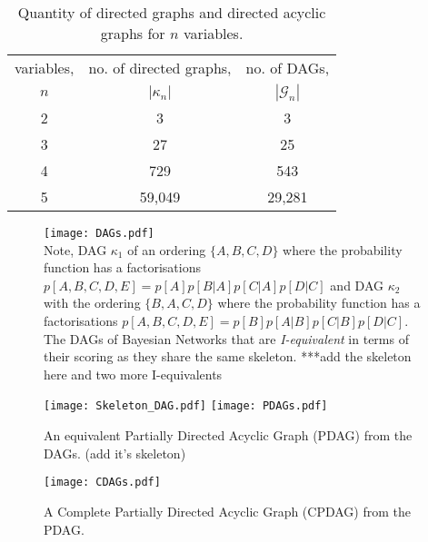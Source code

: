 \documentclass[7pt]{article}
\begin{document}
\begin{table}
\begin{center}
\begin{tabular}{ccc}
	\toprule
	variables, & no. of directed graphs,  & no. of DAGs,  \\
	$n$  & $|\mathcal{\kappa}_n|$ &  $|\mathcal{G}_n|$  \\
	\toprule
	2 & 3 & 3    					\\
	3 & 27 & 25   				  \\
    4 & 729 & 543  				\\
    5 & 59,049 & 29,281 	 \\
    \toprule

\end{tabular}
\caption{Quantity of directed graphs and directed acyclic graphs for $n$ variables.}
 \label{DAGS1}
\end{center}
\end{table}
\begin{figure}
	\centering
	\texttt{[image: DAGs.pdf]} \\
		\caption{Note, DAG $\mathcal{\kappa}_1$ of an ordering $\{A, B, C, D\}$ where the probability function has a factorisations $p[A,B,C,D,E] = p[A]p[B|A]p[C|A]p[D|C]$ and DAG $\mathcal{\kappa}_2$  with the ordering $\{B,A,C,D \}$ where the probability function has a  factorisations $p[A,B,C,D,E] = p[B]p[A|B]p[C|B]p[D|C]$. The DAGs of Bayesian Networks that are \emph{I-equivalent} in terms of their scoring as they share the same skeleton. ***add the skeleton here and two more I-equivalents }
		\label{DAGs}
				\texttt{[image: Skeleton\_DAG.pdf]} 
	\texttt{[image: PDAGs.pdf]} 
		\caption{An equivalent Partially Directed Acyclic Graph (PDAG) from the DAGs. (add it's skeleton)}
	\label{PDAGs}
	\texttt{[image: CDAGs.pdf]}
	\caption{A Complete Partially Directed Acyclic Graph (CPDAG) from the PDAG.}
	\label{CPDAGs}
\end{figure}
\end{document}
